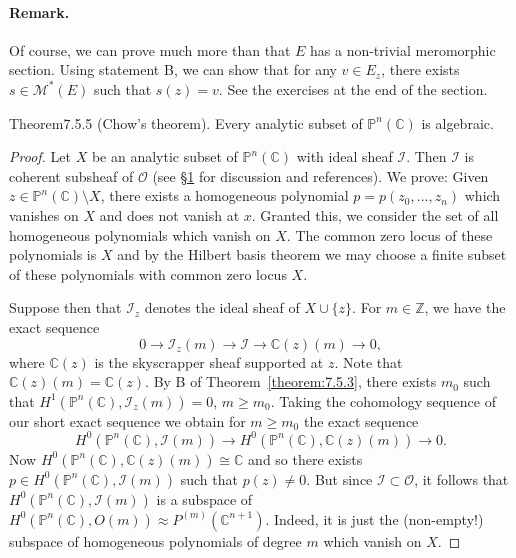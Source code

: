 \paragraph{Remark.} Of course, we can prove much more than that $E$ has a non-trivial meromorphic section. Using statement B, we can show that for any $v\in E_z$, there exists $s\in \mathcal{M}^*(E)$ such that $s(z)=v$. See the exercises at the end of the section.

\begin{originaltheorem}{Theorem}{7.5.5}
(Chow's theorem). Every analytic subset of $\mathbb{P}^n(\mathbb{C})$ is algebraic.
\end{originaltheorem}
\begin{proof}
Let $X$ be an analytic subset of $\mathbb{P}^n(\mathbb{C})$ with ideal sheaf $\mathcal{I}$. Then $\mathcal{I}$ is coherent subsheaf of $\mathcal{O}$ (see \hyperref[sec:7:1]{\S1} for discussion and references). We prove: Given $z\in\mathbb{P}^n(\mathbb{C})\setminus X$, there exists a homogeneous polynomial $p=p(z_0,\ldots,z_n)$ which vanishes on $X$ and does not vanish at $x$. Granted this, we consider the set of all homogeneous polynomials which vanish on $X$. The common zero locus of these polynomials is $X$ and by the Hilbert basis theorem we may choose a finite subset of these polynomials with common zero locus $X$.

Suppose then that $\mathcal{I}_z$ denotes the ideal sheaf of $X\cup\{z\}$. For $m\in\mathbb{Z}$, we have the exact sequence
\[
0\to\mathcal{I}_z(m)\to\mathcal{I}\to\mathbb{C}(z)(m)\to0,
\]
where $\mathbb{C}(z)$ is the skyscrapper sheaf supported at $z$. Note that $\mathbb{C}(z)(m)=\mathbb{C}(z)$. By B of Theorem~\ref{theorem:7.5.3}, there exists $m_0$ such that $H^1(\mathbb{P}^n(\mathbb{C}),\mathcal{I}_z(m))=0$, $m\geq m_0$. Taking the cohomology sequence of our short exact sequence we obtain for $m\geq m_0$ the exact sequence
\[
H^0(\mathbb{P}^n(\mathbb{C}),\mathcal{I}(m))\to H^0(\mathbb{P}^n(\mathbb{C}),\mathbb{C}(z)(m))\to0.
\]
Now $H^0(\mathbb{P}^n(\mathbb{C}),\mathbb{C}(z)(m))\cong\mathbb{C}$ and so there exists $p\in H^0(\mathbb{P}^n(\mathbb{C}),\mathcal{I}(m))$ such that $p(z)\ne0$. But since $\mathcal{I}\subset\mathcal{O}$, it follows that $H^0(\mathbb{P}^n(\mathbb{C}),\mathcal{I}(m))$ is a subspace of $H^0(\mathbb{P}^n(\mathbb{C}),O(m))\approx P^{(m)}(\mathbb{C}^{n+1})$. Indeed, it is just the (non-empty!) subspace of homogeneous polynomials of degree $m$ which vanish on $X$.
\end{proof}
